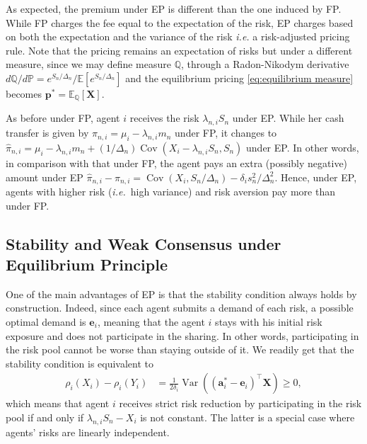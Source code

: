 \documentclass[fleqn,mnsc,nonblindrev]{informs4}
\newcommand{\EE}{\mathbb{E}}
\newcommand{\QQ}{\mathbb{Q}}
\newcommand{\PP}{\mathbb{P}}
\newcommand{\Var}{\operatorname{Var}}
\newcommand{\Cov}{\operatorname{Cov}}
\newcommand{\tb}[1]{\textbf{#1}}
\begin{document}
As expected,   {the premium under EP} is different than the one induced by FP. While FP charges the fee equal to the expectation of the risk, EP charges based on both the expectation and the variance of the risk  {\textit{i.e.} a risk-adjusted pricing rule}. Note that the pricing remains an expectation of risks but under a different measure, since we may define measure $\QQ$, through a Radon-Nikodym derivative $d\QQ/d\PP=e^{S_n/\Delta_n}/\EE[e^{S_n/\Delta_n}]$ and the equilibrium pricing   {\eqref{eq:equilibrium measure} becomes 
$\tb{p}^*=\EE_{\QQ}[\tb{X}]$.}

As before under FP, agent $i$ receives the risk $\lambda_{n,i}S_n$ under EP. While her cash transfer is given by  {$\pi_{n,i}=\mu_i-\lambda_{n,i}m_n$} under FP, it changes to  {$\hat{\pi}_{n,i}=\mu_i-\lambda_{n,i}m_n+(1/\Delta_n)\Cov(X_i-\lambda_{n,i}S_n,S_n)$} under EP. In other words, in comparison with that under FP, the agent pays an extra (possibly negative) amount under EP  {$\hat{\pi}_{n,i}-\pi_{n,i}=\Cov\left(X_i,S_n/\Delta_n\right)-\delta_is_n^2/\Delta^2_n.$} Hence, under EP, agents with higher risk ({\it i.e.}~high variance) and risk aversion pay more than under FP.

\subsection{Stability and Weak Consensus under Equilibrium Principle}\label{sec:newpricing_stability}  
One of the main advantages of EP is that the stability condition always holds   {by construction.} Indeed, since each agent submits a demand of each risk, a possible optimal demand is $\tb{e}_i$,   {meaning} that the agent $i$ stays with his initial risk exposure and does not participate in the sharing. In other words, participating in the risk pool cannot be worse than staying outside of it. We readily get that the stability condition is equivalent to 
\begin{align}
\rho_{i}(X_i)-\rho_{i}\left(Y_i\right)
&=\frac{1}{2\delta_i}\Var((\mathbf{a}_{i}^*-\mathbf{e}_{i})^\top\mathbf{X})\geq 0,\label{ineq:equi_stab_weak}
\end{align}
which means that agent $i$ receives strict risk reduction by participating in the risk pool if and only if $\lambda_{n,i}S_n-X_i$ is not constant. The latter is a special case where agents' risks are linearly independent.
\end{document}
